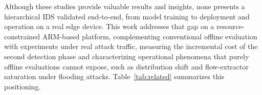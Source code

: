 \documentclass[conference]{IEEEtran}
\begin{document}
Although these studies provide valuable results and insights, none presents a hierarchical IDS validated end-to-end, from model training to deployment and operation on a real edge device. This work addresses that gap on a resource-constrained ARM-based platform, complementing conventional offline evaluation with experiments under real attack traffic, measuring the incremental cost of the second detection phase and characterizing operational phenomena that purely offline evaluations cannot expose, such as distribution shift and flow-extractor saturation under flooding attacks. Table~\ref{tab:related} summarizes this positioning.


\begin{table}[t]
\centering
\caption{Positioning of this work with respect to the literature.}
\label{tab:related}
\setlength{\tabcolsep}{3pt}
\end{table}
\end{document}
